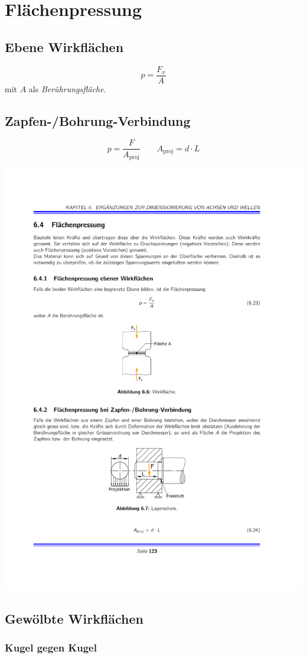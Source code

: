 \section{Flächenpressung} %
	\subsection{Ebene Wirkflächen} %
		\begin{equation*}
			p = \frac{F_x}{A}
		\end{equation*}
		mit $A$ als \emph{Berührungsfläche}.
	\subsection{Zapfen-/Bohrung-Verbindung} %
		\begin{equation*}
			p = \frac{F}{A_\text{proj}} \qquad A_\text{proj} = d\cdot L
		\end{equation*}
		\vspace{-2cm}
		\begin{flushright}
			\includegraphics[width=.4\columnwidth]{graphics/lagerschale}
		\end{flushright}
	\subsection{Gewölbte Wirkflächen} %
		\subsubsection{Kugel gegen Kugel} %
			
